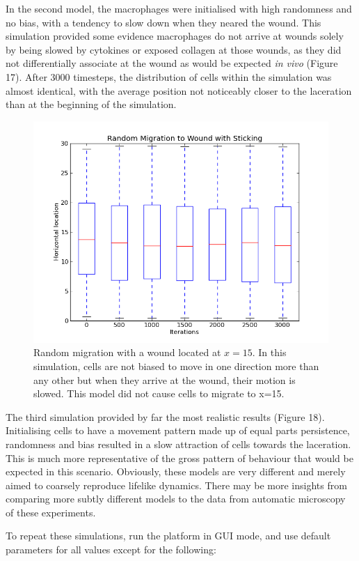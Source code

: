 \documentclass[12pt]{article}
\begin{document}
In the second model, the macrophages were initialised with high 
randomness and no bias, with a tendency to slow down when they neared the 
wound. This simulation provided some evidence macrophages do not arrive 
at wounds solely by being slowed by cytokines or exposed collagen at 
those wounds, as they did not differentially associate at the wound as 
would be expected {\itshape in vivo} (Figure 17). After 3000 timesteps, 
the distribution of cells within the simulation was almost identical, 
with the average position not noticeably closer to the laceration than 
at the beginning of the simulation.
\begin{figure}[H]
\centering
\includegraphics[width=11.51cm]{media/RandomMigrationtoWound.png}
\caption{Random migration with a wound located at \(x=15\). In this simulation, 
  cells are not biased
  to move in one direction more than any other but when they arrive at the wound,
  their motion is slowed. This model did not cause cells to migrate to x=15.
}
\end{figure}

The third simulation provided by far the most realistic results (Figure 18). 
Initialising cells to have a movement pattern made up of equal parts 
persistence, randomness and bias resulted in a slow attraction of cells 
towards the laceration. This is much more representative of the gross 
pattern of behaviour that would be expected in this scenario. Obviously, 
these models are very different and merely aimed to coarsely reproduce 
lifelike dynamics. There may be more insights from comparing more subtly 
different models to the data from automatic microscopy of these 
experiments.

To repeat these simulations, run the platform in GUI mode, and use default
parameters for all values except for the following:
\end{document}
